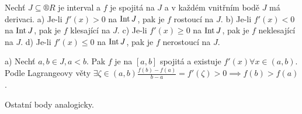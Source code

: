 \documentclass[12pt]{article}					%
\begin{document}
        \begin{veta}
            Nechť $J \subseteq ®R$ je interval a $f$ je spojitá na $J$ a v každém vnitřním bodě $J$ má derivaci. a) Je-li $f'(x) > 0$ na $\operatorname{Int} J$, pak je $f$ rostoucí na $J$. b) Je-li $f'(x) < 0$ na $\operatorname{Int} J$, pak je $f$ klesající na $J$. c) Je-li $f'(x) ≥ 0$ na $\operatorname{Int} J$, pak je $f$ neklesající na $J$. d) Je-li $f'(x) ≤ 0$ na $\operatorname{Int} J$, pak je $f$ nerostoucí na $J$.
            
            \begin{dukazin}
                a) Nechť $a, b \in J, a < b$. Pak $f$ je na $[a, b]$ spojitá a existuje $f'(x) \forall x \in (a, b)$. Podle Lagrangeovy věty $\exists \zeta \in (a, b) \frac{f(b) - f(a)}{b - a} = f'(\zeta) > 0 \implies f(b) > f(a)$.

                Ostatní body analogicky.
            \end{dukazin}
        \end{veta}
\end{document}
